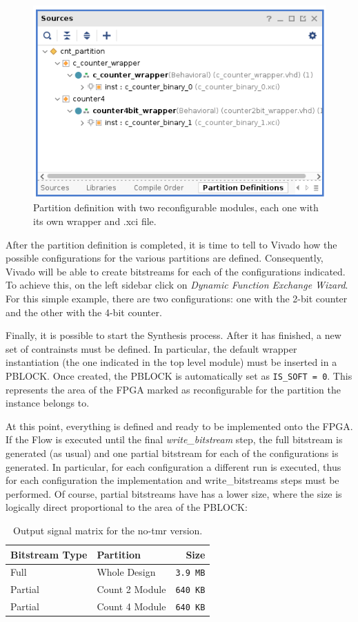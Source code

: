 \begin{figure}[H]
\centering
\includegraphics[width=0.80\linewidth]{images/chapter4/parts.png}
\caption{Partition definition with two reconfigurable modules, each one with its own wrapper and .xci file.}
\end{figure}

After the partition definition is completed, it is time to tell to Vivado how the possible configurations for the various partitions are defined. Consequently, Vivado will be able to create bitstreams for each of the configurations indicated. To achieve this, on the left sidebar click on \textit{Dynamic Function Exchange Wizard}. For this simple example, there are two configurations: one with the 2-bit counter and the other with the 4-bit counter. \bigskip

Finally, it is possible to start the Synthesis process. After it has finished, a new set of contrainsts must be defined. In particular, the default wrapper instantiation (the one indicated in the top level module) must be inserted in a PBLOCK. Once created, the PBLOCK is automatically set as \texttt{IS_SOFT = 0}. This represents the area of the FPGA marked as reconfigurable for the partition the instance belongs to.\bigskip

At this point, everything is defined and ready to be implemented onto the FPGA. If the Flow is executed until the final \textit{write_bitstream} step, the full bitstream is generated (as usual) and one partial bitstream for each of the configurations is generated. In particular, for each configuration a different run is executed, thus for each configuration the implementation and write_bitstreams steps must be performed. Of course, partial bitstreams have has a lower size, where the size is logically direct proportional to the area of the PBLOCK:

\begin{table}[H]
\centering
\begin{tabular}{ l|lr }
    \textbf{Bitstream Type}&\textbf{Partition}&\textbf{Size}\\
    \hline
    Full&Whole Design&\texttt{3.9 MB}\\
    Partial&Count 2 Module&\texttt{640 KB}\\
    Partial&Count 4 Module&\texttt{640 KB}\\
\end{tabular}
\caption{Output signal matrix for the no-tmr version.}
\end{table}

